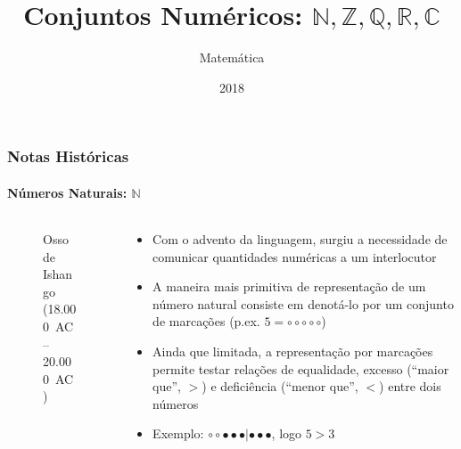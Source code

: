 \documentclass[usenames,dvipsnames,svgnames]{beamer}
\title{Conjuntos Numéricos: $\mathbb{N}, \mathbb{Z}, \mathbb{Q}, \mathbb{R}, \mathbb{C}$}
\author{Matemática}
\institute{ONGEP}
\date{2018}
\begin{document}
\frame{\titlepage}

\begin{frame}
	
	\frametitle{Notas Históricas}
	\framesubtitle{Números Naturais: $\mathbb{N}$}

	\begin{columns}[t]
	\begin{column}{.25\textwidth}
		\begin{figure}
			\caption{\small Osso de Ishango (18.000~AC -- 20.000~AC)}
		\end{figure}
	\end{column}
	\begin{column}{.75\textwidth}
		\begin{itemize}
		\item Com o advento da linguagem, surgiu a necessidade de comunicar quantidades numéricas a um interlocutor
		\item A maneira mais primitiva de representação de um número natural consiste em denotá-lo por um conjunto de marcações (p.ex. $5 = \circ \circ \circ \circ \circ$)
		\item Ainda que limitada, a representação por marcações permite testar relações de equalidade, excesso (``maior que'', $>$) e deficiência (``menor que'', $<$) entre dois números
		\item Exemplo: $\circ \circ \bullet \bullet \bullet | \bullet \bullet \bullet$, logo $5 > 3$
		\end{itemize}
	\end{column}
	\end{columns}

\end{frame}
\end{document}
